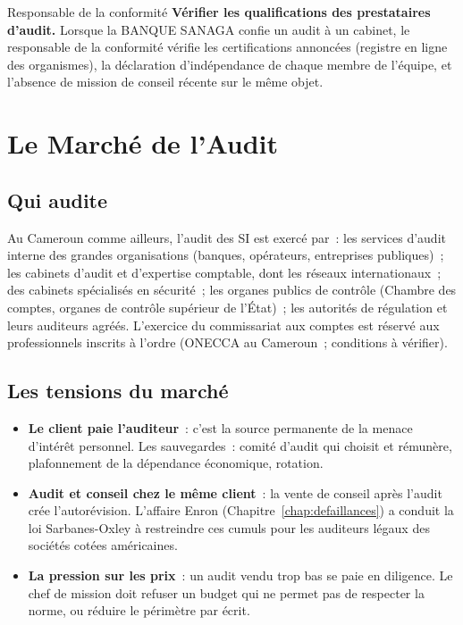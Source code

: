 \begin{boxmetier}{Responsable de la conformité}
\textbf{Vérifier les qualifications des prestataires d'audit.} Lorsque la
BANQUE SANAGA confie un audit à un cabinet, le responsable de la
conformité vérifie les certifications annoncées (registre en ligne des
organismes), la déclaration d'indépendance de chaque membre de l'équipe,
et l'absence de mission de conseil récente sur le même objet.
\end{boxmetier}

\section{Le Marché de l'Audit}
\label{sec:c16-marche}

\subsection{Qui audite}

Au Cameroun comme ailleurs, l'audit des SI est exercé par~: les services
d'audit interne des grandes organisations (banques, opérateurs, entreprises
publiques)~; les cabinets d'audit et d'expertise comptable, dont les
réseaux internationaux~; des cabinets spécialisés en sécurité~; les
organes publics de contrôle (Chambre des comptes, organes de contrôle
supérieur de l'État)~; les autorités de régulation et leurs auditeurs
agréés. L'exercice du commissariat aux comptes est réservé aux
professionnels inscrits à l'ordre (ONECCA au Cameroun~; conditions à
vérifier).

\subsection{Les tensions du marché}

\begin{itemize}
    \item \textbf{Le client paie l'auditeur}~: c'est la source permanente de
          la menace d'intérêt personnel. Les sauvegardes~: comité d'audit
          qui choisit et rémunère, plafonnement de la dépendance
          économique, rotation.
    \item \textbf{Audit et conseil chez le même client}~: la vente de
          conseil après l'audit crée l'autorévision. L'affaire Enron
          (Chapitre~\ref{chap:defaillances}) a conduit la loi
          Sarbanes-Oxley à restreindre ces cumuls pour les auditeurs légaux
          des sociétés cotées américaines.
    \item \textbf{La pression sur les prix}~: un audit vendu trop bas se
          paie en diligence. Le chef de mission doit refuser un budget qui
          ne permet pas de respecter la norme, ou réduire le périmètre par
          écrit.
\end{itemize}


